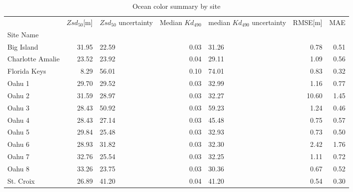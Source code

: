 \begin{table}
\centering
\caption{Ocean color summary by site}
\label{tab:ocean_color_summary_by_site}
\begin{tabular}{lrp{2cm}rp{2cm}rr}
\toprule
{} &  $Zsd_{50}$[m] &  $Zsd_{50}$ uncertainty &  Median $Kd_{490}$ &  median $Kd_{490}$ uncertainty &  RMSE[m] &  MAE \\
Site Name        &                &                         &                    &                                &          &      \\
\midrule
Big Island       &          31.95 &                   22.59 &               0.03 &                          31.26 &     0.78 & 0.51 \\
Charlotte Amalie &          23.52 &                   23.92 &               0.04 &                          29.11 &     1.09 & 0.56 \\
Florida Keys     &           8.29 &                   56.01 &               0.10 &                          74.01 &     0.83 & 0.32 \\
Oahu 1           &          29.70 &                   29.52 &               0.03 &                          32.99 &     1.16 & 0.77 \\
Oahu 2           &          31.59 &                   28.97 &               0.03 &                          32.27 &    10.60 & 1.45 \\
Oahu 3           &          28.43 &                   50.92 &               0.03 &                          59.23 &     1.24 & 0.46 \\
Oahu 4           &          28.43 &                   27.14 &               0.03 &                          45.48 &     0.75 & 0.57 \\
Oahu 5           &          29.84 &                   25.48 &               0.03 &                          32.93 &     0.73 & 0.50 \\
Oahu 6           &          28.93 &                   31.82 &               0.03 &                          32.30 &     2.42 & 1.76 \\
Oahu 7           &          32.76 &                   25.54 &               0.03 &                          32.25 &     1.11 & 0.72 \\
Oahu 8           &          33.26 &                   23.75 &               0.03 &                          30.36 &     0.67 & 0.52 \\
St. Croix        &          26.89 &                   41.20 &               0.04 &                          41.20 &     0.54 & 0.30 \\
\bottomrule
\end{tabular}
\end{table}
